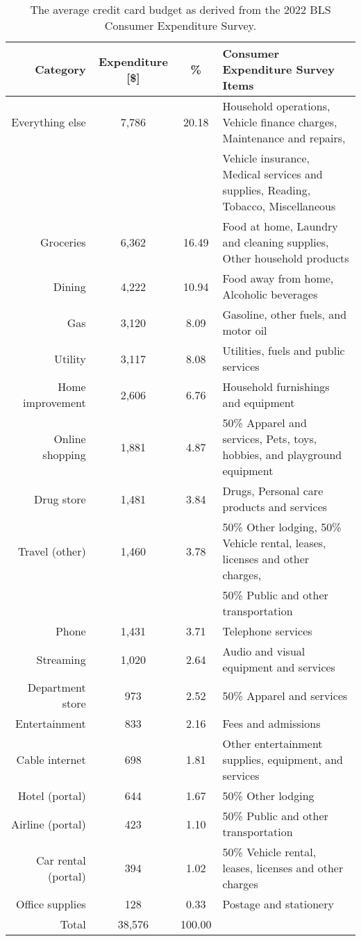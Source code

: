 \begin{table}[t!bh]
    \centering
    \begin{tabular}{ r c c l} 
        \hline
        Category & Expenditure [\$] & \% & Consumer Expenditure Survey Items \\ 
        \hline
        Everything else	& 7,786 & 20.18 & Household operations, Vehicle finance charges, Maintenance and repairs, \\
        & & & Vehicle insurance, Medical services and supplies, Reading, Tobacco, Miscellaneous \\
        Groceries & 6,362 & 16.49 & Food at home, Laundry and cleaning supplies, Other household products \\
        Dining & 4,222 & 10.94 & Food away from home, Alcoholic beverages \\
        Gas	& 3,120	& 8.09 & Gasoline, other fuels, and motor oil \\
        Utility	& 3,117	& 8.08 & Utilities, fuels and public services\\
        Home improvement & 2,606 & 6.76 & Household furnishings and equipment \\
        Online shopping	& 1,881	& 4.87 & 50\% Apparel and services, Pets, toys, hobbies, and playground equipment\\
        Drug store	& 1,481 & 3.84 & Drugs, Personal care products and services \\
        Travel (other) & 1,460 & 3.78 & 50\% Other lodging, 50\% Vehicle rental, leases, licenses and other charges, \\
        & & & 50\% Public and other transportation \\
        Phone & 1,431 & 3.71 & Telephone services\\
        Streaming & 1,020 & 2.64 & Audio and visual equipment and services\\
        Department store & 973 & 2.52 & 50\% Apparel and services \\
        Entertainment & 833 & 2.16 & Fees and admissions \\
        Cable internet & 698 & 1.81 & Other entertainment supplies, equipment, and services \\
        Hotel (portal) & 644 & 1.67 & 50\% Other lodging \\
        Airline (portal) & 423 & 1.10 & 50\% Public and other transportation\\
        Car rental (portal) & 394 & 1.02 & 50\% Vehicle rental, leases, licenses and other charges \\
        Office supplies & 128 &	0.33 & Postage and stationery \\
        \hline
        \hline
        Total & 38,576	& 100.00 & \\
    \end{tabular}
    \caption{The average credit card budget as derived from the 2022 BLS Consumer Expenditure Survey.}
    \label{tab:BudgetExtended}
\end{table}

